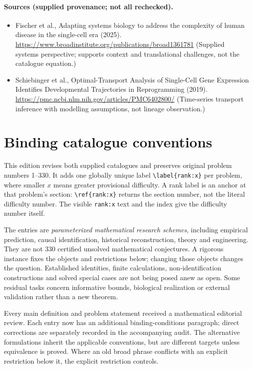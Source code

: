 \documentclass[11pt]{article}
\begin{document}
\paragraph{Sources (supplied provenance; not all rechecked).}
\begin{itemize}
\item Fischer et al., Adapting systems biology to address the complexity of human disease in the single-cell era (2025). \url{https://www.broadinstitute.org/publications/broad1361781} (Supplied systems perspective; supports context and translational challenges, not the catalogue equation.)
\item Schiebinger et al., Optimal-Transport Analysis of Single-Cell Gene Expression Identifies Developmental Trajectories in Reprogramming (2019). \url{https://pmc.ncbi.nlm.nih.gov/articles/PMC6402800/} (Time-series transport inference with modelling assumptions, not lineage observation.)
\end{itemize}


\section*{Binding catalogue conventions}
This edition revises both supplied catalogues and preserves original problem numbers 1--330. It adds one globally unique label \verb|\label{rank:x}| per problem, where smaller $x$ means greater provisional difficulty. A rank label is an anchor at that problem's section: \verb|\ref{rank:x}| returns the section number, not the literal difficulty number. The visible \texttt{rank:x} text and the index give the difficulty number itself.

The entries are \emph{parameterized mathematical research schemes}, including empirical prediction, causal identification, historical reconstruction, theory and engineering. They are not 330 certified unsolved mathematical conjectures. A rigorous instance fixes the objects and restrictions below; changing those objects changes the question. Established identities, finite calculations, non-identification constructions and solved special cases are not being posed anew as open. Some residual tasks concern informative bounds, biological realization or external validation rather than a new theorem.

Every main definition and problem statement received a mathematical editorial review. Each entry now has an additional binding-conditions paragraph; direct corrections are separately recorded in the accompanying audit. The alternative formulations inherit the applicable conventions, but are different targets unless equivalence is proved. Where an old broad phrase conflicts with an explicit restriction below it, the explicit restriction controls.
\end{document}
